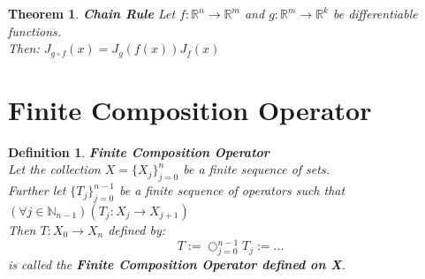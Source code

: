 \documentclass[12pt]{extarticle}
\theoremstyle{plain}
\newtheorem{thm}{Theorem}[section]
\theoremstyle{Definition}
\newtheorem{def.}{Definition}[section]
\theoremstyle{Definition}
\theoremstyle{plain}
\begin{document}
\begin{thm} \textbf{Chain Rule}
	Let $f : \mathbb{R}^n \to \mathbb{R}^m$ and $g : \mathbb{R}^m \to \mathbb{R}^k$ be differentiable functions. \\ 
	Then: $J_{g \circ f}(x) = J_g(f(x))J_f(x)$ \\ 
\end{thm}

\section{Finite Composition Operator}
\begin{def.} \textbf{Finite Composition Operator} \\ 
	Let the collection $X = \{X_j\}_{j=0}^{n}$ be a finite sequence of sets. \\ 
	Further let $\{T_j\}_{j=0}^{n-1}$ be a finite sequence of operators such that $(\forall j \in \mathbb{N}_{n-1})(T_j : X_j \to X_{j+1})$ \\ 
	Then $T : X_0 \to X_{n}$ defined by: 
	$$T := \bigcirc_{j=0}^{n-1} T_j := ...$$ 
	is called the \textbf{Finite Composition Operator defined on X}. \\ 
\end{def.}
\end{document}
